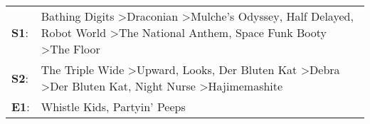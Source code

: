 \begin{supertabular}{p{0.03\textwidth}p{0.92\textwidth}}
 \textbf{S1}:  &  Bathing Digits\textsuperscript{} \textgreater \enspace Draconian\textsuperscript{} \textgreater \enspace Mulche's Odyssey\textsuperscript{}, \enspace Half Delayed\textsuperscript{}, \enspace Robot World\textsuperscript{} \textgreater \enspace The National Anthem\textsuperscript{}, \enspace Space Funk Booty\textsuperscript{} \textgreater \enspace The Floor\textsuperscript{}  \enspace  \\
 \textbf{S2}:  &                         The Triple Wide\textsuperscript{} \textgreater \enspace Upward\textsuperscript{}, \enspace Looks\textsuperscript{}, \enspace Der Bluten Kat\textsuperscript{} \textgreater \enspace Debra\textsuperscript{} \textgreater \enspace Der Bluten Kat\textsuperscript{}, \enspace Night Nurse\textsuperscript{} \textgreater \enspace Hajimemashite\textsuperscript{}  \enspace  \\
 \textbf{E1}:  &                                                                                                                                                                                                                                                                                                                Whistle Kids\textsuperscript{}, \enspace Partyin' Peeps\textsuperscript{}  \enspace  \\
\end{supertabular}
